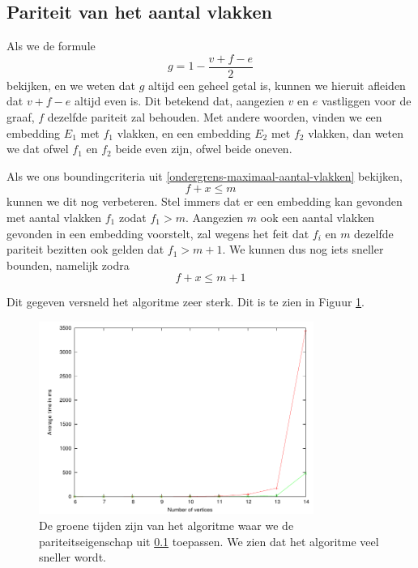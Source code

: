\documentclass{article}
\begin{document}
\subsection{Pariteit van het aantal vlakken}
\label{pariteit}
Als we de formule
\begin{equation*}
g = 1 - \frac{v + f - e}{2}
\end{equation*}
bekijken, en we weten dat $g$ altijd een geheel getal is, kunnen we hieruit
afleiden dat $v + f - e$ altijd even is. Dit betekend dat, aangezien $v$ en $e$
vastliggen voor de graaf, $f$ dezelfde pariteit zal behouden. Met andere
woorden, vinden we een embedding $E_1$ met $f_1$ vlakken, en een embedding $E_2$
met $f_2$ vlakken, dan weten we dat ofwel $f_1$ en $f_2$ beide even zijn, ofwel
beide oneven.

Als we ons boundingcriteria uit \ref{ondergrens-maximaal-aantal-vlakken}
bekijken,
\begin{equation*}
f + x \leq m
\end{equation*}
kunnen we dit nog verbeteren. Stel immers dat er een embedding kan gevonden met
aantal vlakken $f_1$ zodat $f_1 > m$. Aangezien $m$ ook een aantal vlakken
gevonden in een embedding voorstelt, zal wegens het feit dat $f_i$ en $m$
dezelfde pariteit bezitten ook gelden dat $f_1 > m + 1$. We kunnen dus nog iets
sneller bounden, namelijk zodra
\begin{equation*}
f + x \leq m + 1
\end{equation*}

Dit gegeven versneld het algoritme zeer sterk. Dit is te zien in Figuur
\ref{fig:bounded-vs-parity}.

\begin{figure}
\begin{center}
\includegraphics[width=0.8\textwidth]{images/bounded-vs-parity.pdf}
\caption{De groene tijden zijn van het algoritme waar we de
pariteitseigenschap uit \ref{pariteit} toepassen. We zien dat het algoritme
veel sneller wordt.}
\label{fig:bounded-vs-parity}
\end{center}
\end{figure}
\end{document}

